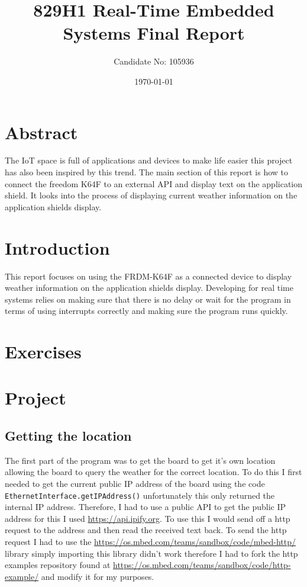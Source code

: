 \documentclass[a4paper,12pt]{scrartcl}
\title{829H1 Real-Time Embedded Systems Final Report}
\author{Candidate No: 105936}
\date{\today}
\begin{document}
	
	\begin{titlepage}
		\maketitle
	\end{titlepage}
	
	\tableofcontents
	\newpage

	\section{Abstract}
	{
		The IoT space is full of applications and devices to make life easier this project has also been inspired by this trend. The main section of this report is how to connect the freedom K64F\cite{nxpproducts2014} to an external API and display text on the application shield. It looks into the process of displaying current weather information on the application shields display.
	}

	\section{Introduction}
	{
		This report focuses on using the FRDM-K64F\cite{nxpproducts2014} as a connected device to display weather information on the application shields display. Developing for real time systems relies on making sure that there is no delay or wait for the program in terms of using interrupts correctly and making sure the program runs quickly.
	}
	
	\section{Exercises}
	{
	}

	\section{Project}
	{
		\subsection{Getting the location}
		{
			The first part of the program was to get the board to get it's own location allowing the board to query the weather for the correct location. To do this I first needed to get the current public IP address of the board using the code \lstinline|EthernetInterface.getIPAddress()| unfortunately this only returned the internal IP address. Therefore, I had to use a public API to get the public IP address for this I used \url{https://api.ipify.org}\cite{Degges}. To use this I would send off a http request to the address and then read the received text back. To send the http request I had to use the \url{https://os.mbed.com/teams/sandbox/code/mbed-http/} library simply importing this library didn't work therefore I had to fork the http examples repository found at \url{https://os.mbed.com/teams/sandbox/code/http-example/} and modify it for my purposes.
		}
	}
	
\end{document}
